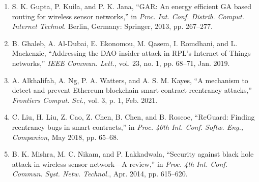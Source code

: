 \documentclass{article} %
\begin{document}
\begin{enumerate}
\item  S. K. Gupta, P. Kuila, and P. K. Jana, ``GAR: An energy efficient GA based routing for wireless sensor networks,'' in \textit{Proc. Int. Conf. Distrib. Comput. Internet Technol. }Berlin, Germany: Springer, 2013, pp. 267--277.

\item  B. Ghaleb, A. Al-Dubai, E. Ekonomou, M. Qasem, I. Romdhani, and L. Mackenzie, ``Addressing the DAO insider attack in RPL's Internet of Things networks,'' \textit{IEEE Commun. Lett.}, vol. 23, no. 1, pp. 68--71, Jan. 2019.

\item  A. Alkhalifah, A. Ng, P. A. Watters, and A. S. M. Kayes, ``A mechanism to detect and prevent Ethereum blockchain smart contract reentrancy attacks,'' \textit{Frontiers Comput. Sci.}, vol. 3, p. 1, Feb. 2021.

\item  C. Liu, H. Liu, Z. Cao, Z. Chen, B. Chen, and B. Roscoe, ``ReGuard: Finding reentrancy bugs in smart contracts,'' in \textit{Proc. 40th Int. Conf. Softw. Eng., Companion}, May 2018, pp. 65--68.

\item  B. K. Mishra, M. C. Nikam, and P. Lakkadwala, ``Security against black hole attack in wireless sensor network---A review,'' in \textit{Proc. 4th Int. Conf. Commun. Syst. Netw. Technol.}, Apr. 2014, pp. 615--620.
\end{enumerate}
\end{document}
